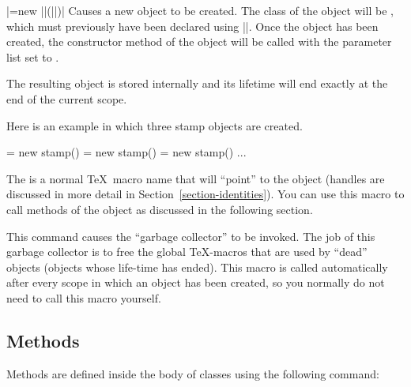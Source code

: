 \begin{command}{\pgfoonew{}|=new ||(||)|}
  Causes a new object to be created. The class of the object will be
  , which must previously have been declared using
  |\pgfooclass|. Once the object has been created, the constructor
  method of the object will be called with the parameter list set to
  .

  The resulting object is stored internally and its lifetime will
  end exactly at the end of the current scope.

  Here is an example in which three stamp objects are created.
\begin{codeexample}
\pgfoonew \firststamp  = new stamp()    
\pgfoonew \secondstamp = new stamp()
{
  \pgfoonew \thirdstamp = new stamp()
  ...
}
\end{codeexample}

  The  is a normal \TeX\ macro name that will
  ``point'' to the object (handles are discussed in more detail in
  Section~\ref{section-identities}). You can use this macro to call
  methods of the object as discussed in the following section.
\end{command}

\begin{command}{\pgfoogc}
  This command causes the ``garbage collector'' to be invoked. The job
  of this garbage collector is to free the global \TeX-macros that are
  used by ``dead'' objects (objects whose life-time has ended). This
  macro is called automatically after every scope in which an object
  has been created, so you normally do not need to call this macro
  yourself.
\end{command}


\subsection{Methods}

Methods are defined inside the body of classes using the following
command: 

